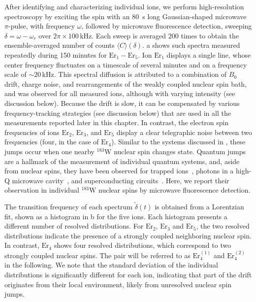 After identifying and characterizing individual \Er ions, we perform high-resolution spectroscopy by exciting the spin with an 80~\textmu s long Gaussian-shaped microwave $\pi$-pulse, with frequency $\omega$, followed by microwave fluorescence detection, sweeping $\delta = \omega - \omega_r$ over $2\pi \times 100$\,kHz. Each sweep is averaged 200 times to obtain the ensemble-averaged number of counts $\langle C \rangle (\delta)$. a shows such spectra measured repeatedly during 150 minutes for $\mathrm{Er}_1 - \mathrm{Er}_5$. Ion $\mathrm{Er}_1$ displays a single line, whose center frequency fluctuates on a timescale of several minutes and on a frequency scale of $\sim 20$\,kHz. This spectral diffusion is attributed to a combination of $B_0$ drift, charge noise, and rearrangements of the weakly coupled nuclear spin bath, and was observed for all measured ions, although with varying intensity (see discussion below). Because the drift is slow, it can be compensated by various frequency-tracking strategies (see discussion below) that are used in all the measurements reported later in this chapter. In contrast, the electron spin frequencies of ions $\mathrm{Er}_2$, $\mathrm{Er}_3$, and $\mathrm{Er}_5$ display a clear telegraphic noise between two frequencies (four, in the case of $\mathrm{Er}_4$). Similar to the systems discussed in , these jumps occur when one nearby $^{183}\mathrm{W}$ nuclear spin changes state. Quantum jumps are a hallmark of the measurement of individual quantum systems, and, aside from nuclear spins, they have been observed for trapped ions~, photons in a high-Q microwave cavity~, and superconducting circuits~. Here, we report their observation in individual $^{183}\mathrm{W}$ nuclear spins by microwave fluorescence detection.

The transition frequency of each spectrum $\tilde{\delta}(t)$ is obtained from a Lorentzian fit, shown as a histogram in b for the five ions. Each histogram presents a different number of resolved distributions. For $\mathrm{Er}_2$, $\mathrm{Er}_3$ and $\mathrm{Er}_5$, the two resolved distributions indicate the presence of a strongly coupled neighboring nuclear spin. In contrast, $\mathrm{Er}_4$ shows four resolved distributions, which correspond to two strongly coupled nuclear spins. The pair will be referred to as $\mathrm{Er}_4^{(1)}$ and $\mathrm{Er}_4^{(2)}$ in the following. We note that the standard deviation of the individual distributions is significantly different for each ion, indicating that part of the drift originates from their local environment, likely from unresolved nuclear spin jumps.

